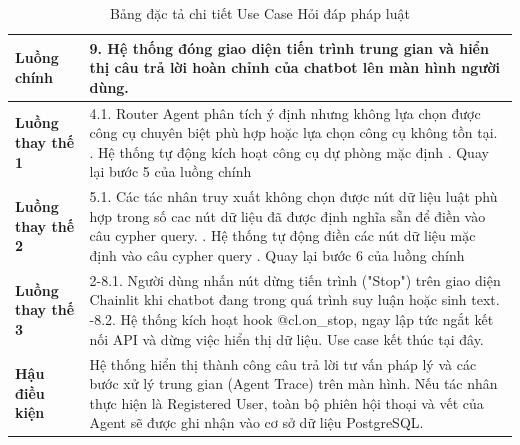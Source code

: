 \documentclass[../DoAn.tex]{subfiles}
\begin{document}
\begin{table}[H]
\centering
\begin{tabular}{|p{3.5cm}|p{11.5cm}|}
\hline
\textbf{Luồng chính} & 
9. Hệ thống đóng giao diện tiến trình trung gian và hiển thị câu trả lời hoàn chỉnh của chatbot lên màn hình người dùng. \\ \hline
\textbf{Luồng thay thế 1} & 
4.1. Router Agent phân tích ý định nhưng không lựa chọn được công cụ chuyên biệt phù hợp hoặc lựa chọn công cụ không tồn tại. \newline
4.2. Hệ thống tự động kích hoạt công cụ dự phòng mặc định \newline
4.3. Quay lại bước 5 của luồng chính\\ \hline
\textbf{Luồng thay thế 2} & 
5.1. Các tác nhân truy xuất không chọn được nút dữ liệu luật phù hợp trong số cac nút dữ liệu đã được định nghĩa sẵn để điền vào câu cypher query. \newline
5.2. Hệ thống tự động điền các nút dữ liệu mặc định vào câu cypher query \newline
5.3. Quay lại bước 6 của luồng chính \\ \hline
\textbf{Luồng thay thế 3} & 
2-8.1. Người dùng nhấn nút dừng tiến trình ("Stop") trên giao diện Chainlit khi chatbot đang trong quá trình suy luận hoặc sinh text. \newline
2-8.2. Hệ thống kích hoạt hook @cl.on\_stop, ngay lập tức ngắt kết nối API và dừng việc hiển thị dữ liệu. Use case kết thúc tại đây. \\ \hline
\textbf{Hậu điều kiện} & Hệ thống hiển thị thành công câu trả lời tư vấn pháp lý và các bước xử lý trung gian (Agent Trace) trên màn hình. Nếu tác nhân thực hiện là Registered User, toàn bộ phiên hội thoại và vết của Agent sẽ được ghi nhận vào cơ sở dữ liệu PostgreSQL. \\ \hline
\end{tabular}
\caption{Bảng đặc tả chi tiết Use Case Hỏi đáp pháp luật}
\label{table:uc_specs_qa}
\end{table}
\end{document}
